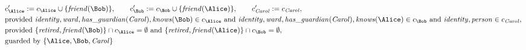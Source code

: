 \begin{align*}
&
c'_
{
\Alice
}
 := 
c_
{
\Alice
}
 \cup 
\{
\mathit{\detokenize{
friend
}}
(
\Bob
)
\}
, \qquad 
c'_
{
\Bob
}
 := 
c_
{
\Bob
}
 \cup 
\{
\mathit{\detokenize{
friend
}}
(
\Alice
)
\}
, \qquad 
c'_
{
\mathit{Carol}
}
 := 
c_
{
\mathit{Carol}
}
,\\
&
\text{provided } 
\mathit{\detokenize{
identity
}}
,
\mathit{\detokenize{
ward
}}
,
\mathit{\detokenize{
has_guardian
}}
(
\mathit{Carol}
)
,
\mathit{\detokenize{
knows
}}
(
\Bob
)
 \in c_
{
\Alice
}
 \text{ and } 
\mathit{\detokenize{
identity
}}
,
\mathit{\detokenize{
ward
}}
,
\mathit{\detokenize{
has_guardian
}}
(
\mathit{Carol}
)
,
\mathit{\detokenize{
knows
}}
(
\Alice
)
 \in c_
{
\Bob
}
 \text{ and } 
\mathit{\detokenize{
identity
}}
,
\mathit{\detokenize{
person
}}
 \in c_
{
\mathit{Carol}
}
,\\
&
\text{provided } 
\{
\mathit{\detokenize{
retired
}}
,
\mathit{\detokenize{
friend
}}
(
\Bob
)
\}
 \cap c_
{
\Alice
}
 = \emptyset
 \text{ and } 
\{
\mathit{\detokenize{
retired
}}
,
\mathit{\detokenize{
friend
}}
(
\Alice
)
\}
 \cap c_
{
\Bob
}
 = \emptyset
,\\
&
\text{guarded by } \{
\Alice
,
\Bob
,
\mathit{Carol}
\}
\end{align*}

